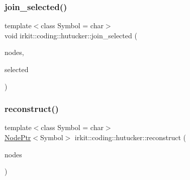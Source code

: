 \subsubsection{\texorpdfstring{join\+\_\+selected()}{join\_selected()}}
{\footnotesize\ttfamily template$<$class Symbol  = char$>$ \\
void irkit\+::coding\+::hutucker\+::join\+\_\+selected (\begin{DoxyParamCaption}\item[{std\+::list$<$ \mbox{\hyperlink{namespaceirkit_1_1coding_1_1hutucker_a3fd5bcbd5c6d608f75e0afbb7f171899}{Node\+Ptr}}$<$ Symbol $>$$>$ \&}]{nodes,  }\item[{std\+::pair$<$ \mbox{\hyperlink{namespaceirkit_1_1coding_1_1hutucker_a3fd5bcbd5c6d608f75e0afbb7f171899}{Node\+Ptr}}$<$ Symbol $>$, \mbox{\hyperlink{namespaceirkit_1_1coding_1_1hutucker_a3fd5bcbd5c6d608f75e0afbb7f171899}{Node\+Ptr}}$<$ Symbol $>$$>$ \&}]{selected }\end{DoxyParamCaption})}

\mbox{\label{namespaceirkit_1_1coding_1_1hutucker_ad86ce5637698c2219a68ceabfa7f37b5}} 
\subsubsection{\texorpdfstring{reconstruct()}{reconstruct()}}
{\footnotesize\ttfamily template$<$class Symbol  = char$>$ \\
\mbox{\hyperlink{namespaceirkit_1_1coding_1_1hutucker_a3fd5bcbd5c6d608f75e0afbb7f171899}{Node\+Ptr}}$<$Symbol$>$ irkit\+::coding\+::hutucker\+::reconstruct (\begin{DoxyParamCaption}\item[{std\+::list$<$ \mbox{\hyperlink{structirkit_1_1coding_1_1hutucker_1_1LevelNode}{Level\+Node}}$<$ Symbol $>$$>$ \&}]{nodes }\end{DoxyParamCaption})}

\mbox{\label{namespaceirkit_1_1coding_1_1hutucker_a6ae88a7692d28d80019e464a2f812b92}} 
